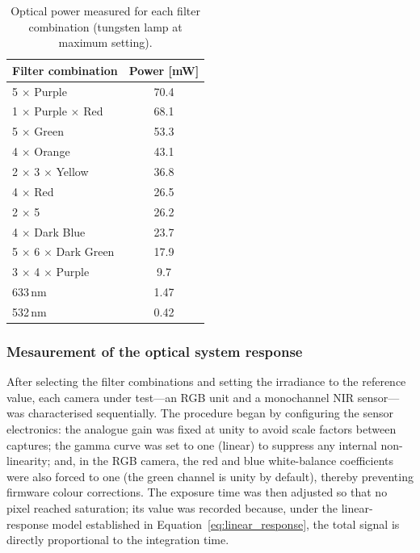 \begin{table}[H]
    \centering
    \caption{Optical power measured for each filter combination (tungsten lamp at maximum setting).}
    \label{tab:optical_power}
    \begin{tabular}{|l|c|}
        \hline
        \rowcolor[HTML]{EFEFEF}
        \textbf{Filter combination} & \textbf{Power [mW]} \\ \hline
        5 $\times$ Purple               & 70.4 \\ \hline
        1 $\times$ Purple $\times$ Red  & 68.1 \\ \hline
        5 $\times$ Green                & 53.3 \\ \hline
        4 $\times$ Orange               & 43.1 \\ \hline
        2 $\times$ 3 $\times$ Yellow    & 36.8 \\ \hline
        4 $\times$ Red                  & 26.5 \\ \hline
        2 $\times$ 5                    & 26.2 \\ \hline
        4 $\times$ Dark Blue            & 23.7 \\ \hline
        5 $\times$ 6 $\times$ Dark Green& 17.9 \\ \hline
        3 $\times$ 4 $\times$ Purple    & 9.7  \\ \hline
        633\,nm                         & 1.47 \\ \hline
        532\,nm                         & 0.42 \\ \hline
    \end{tabular}
\end{table}

\subsubsection{Mesaurement of the optical system response}
\label{subsub:captura_sistemas_opticos}


\noindent
After selecting the filter combinations and setting the irradiance to the reference value, each camera under test—an RGB unit and a monochannel NIR sensor—was characterised sequentially.  
The procedure began by configuring the sensor electronics: the analogue gain was fixed at unity to avoid scale factors between captures; the gamma curve was set to one (linear) to suppress any internal non-linearity; and, in the RGB camera, the red and blue white-balance coefficients were also forced to one (the green channel is unity by default), thereby preventing firmware colour corrections. The exposure time was then adjusted so that no pixel reached saturation; its value was recorded because, under the linear-response model established in Equation~\eqref{eq:linear_response}, the total signal is directly proportional to the integration time.\\


